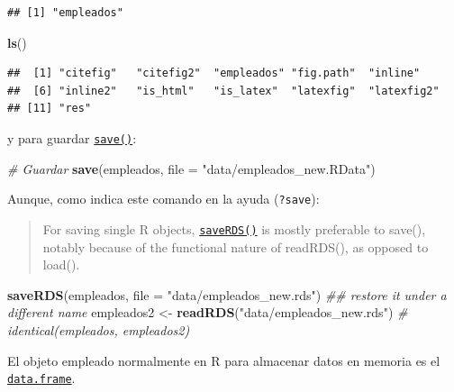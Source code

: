 \documentclass[]{book}
\newenvironment{Shaded}{\begin{snugshade}}{\end{snugshade}}
\newcommand{\CommentTok}[1]{\textcolor[rgb]{0.56,0.35,0.01}{\textit{#1}}}
\newcommand{\DataTypeTok}[1]{\textcolor[rgb]{0.13,0.29,0.53}{#1}}
\newcommand{\KeywordTok}[1]{\textcolor[rgb]{0.13,0.29,0.53}{\textbf{#1}}}
\newcommand{\NormalTok}[1]{#1}
\newcommand{\StringTok}[1]{\textcolor[rgb]{0.31,0.60,0.02}{#1}}
\begin{document}
\begin{verbatim}
## [1] "empleados"
\end{verbatim}

\begin{Shaded}
\begin{Highlighting}[]
\KeywordTok{ls}\NormalTok{()}
\end{Highlighting}
\end{Shaded}

\begin{verbatim}
##  [1] "citefig"   "citefig2"  "empleados" "fig.path"  "inline"   
##  [6] "inline2"   "is_html"   "is_latex"  "latexfig"  "latexfig2"
## [11] "res"
\end{verbatim}

y para guardar \href{https://www.rdocumentation.org/packages/base/versions/3.6.1/topics/save}{\texttt{save()}}:

\begin{Shaded}
\begin{Highlighting}[]
\CommentTok{# Guardar}
\KeywordTok{save}\NormalTok{(empleados, }\DataTypeTok{file =} \StringTok{"data/empleados_new.RData"}\NormalTok{)}
\end{Highlighting}
\end{Shaded}

Aunque, como indica este comando en la ayuda (\texttt{?save}):

\begin{quote}
For saving single R objects, \href{https://www.rdocumentation.org/packages/base/versions/3.6.1/topics/saveRDS}{\texttt{saveRDS()}}
is mostly preferable to save(),
notably because of the functional nature of readRDS(), as opposed to load().
\end{quote}

\begin{Shaded}
\begin{Highlighting}[]
\KeywordTok{saveRDS}\NormalTok{(empleados, }\DataTypeTok{file =} \StringTok{"data/empleados_new.rds"}\NormalTok{)}
\CommentTok{## restore it under a different name}
\NormalTok{empleados2 <-}\StringTok{ }\KeywordTok{readRDS}\NormalTok{(}\StringTok{"data/empleados_new.rds"}\NormalTok{)}
\CommentTok{# identical(empleados, empleados2)}
\end{Highlighting}
\end{Shaded}

El objeto empleado normalmente en R para almacenar datos en memoria
es el \href{https://www.rdocumentation.org/packages/base/versions/3.6.1/topics/data.frame}{\texttt{data.frame}}.
\end{document}
